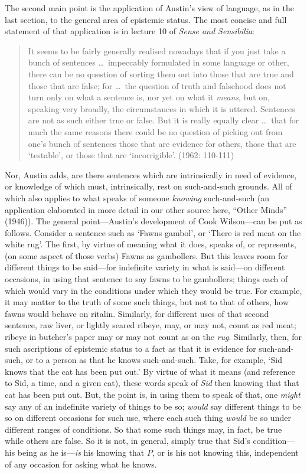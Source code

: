 The second main point is the application of Austin’s view of language, as in the last section, to the general area of epistemic status. The most concise and full statement of that application is in lecture 10 of \emph{Sense and Sensibilia}:
\begin{quote}
	It seems to be fairly generally realised nowadays that if you just take a bunch of sentences \ldots\ impeccably formulated in some language or other, there can be no question of sorting them out into those that are true and those that are false; for \ldots\ the question of truth and falsehood does not turn only on what a sentence is, nor yet on what it \emph{means}, but on, speaking very broadly, the circumstances in which it is uttered. Sentences are not as such either true or false. But it is really equally clear \ldots\ that for much the same reasons there could be no question of picking out from one’s bunch of sentences those that are evidence for others, those that are `testable', or those that are `incorrigible'. (1962: 110-111)
\end{quote}
Nor, Austin adds, are there sentences which are intrinsically in need of evidence, or knowledge of which must, intrinsically, rest on such-and-such grounds. All of which also applies to what speaks of someone \emph{knowing} such-and-such (an application elaborated in more detail in our other source here, “Other Minds” (1946)). The general point—Austin’s development of Cook Wilson---can be put as follows. Consider a sentence such as `Fawns gambol', or `There is red meat on the white rug'. The first, by virtue of meaning what it does, speaks of, or represents, (on some aspect of those verbs) Fawns as gambollers. But this leaves room for different things to be said—for indefinite variety in what is said—on different occasions, in using that sentence to say fawns to be gambollers; things each of which would vary in the conditions under which they would be true. For example, it may matter to the truth of some such things, but not to that of others, how fawns would behave on ritalin. Similarly, for different uses of that second sentence, raw liver, or lightly seared ribeye, may, or may not, count as red meat; ribeye in butcher’s paper may or may not count as on the \emph{rug}. Similarly, then, for such ascriptions of epistemic status to a fact as that it is evidence for such-and-such, or to a person as that he knows such-and-such. Take, for example, ‘Sid knows that the cat has been put out.’ By virtue of what it means (and reference to Sid, a time, and a given cat), these words speak of \emph{Sid} then knowing that that cat has been put out. But, the point is, in using them to speak of that, one \emph{might} say any of an indefinite variety of things to be so; \emph{would} say different things to be so on different occasions for such use, where each such thing \emph{would} be so under different ranges of conditions. So that some such things may, in fact, be true while others are false. So it is not, in general, simply true that Sid’s condition---his being as he is---\emph{is} his knowing that \( P \), or is his not knowing this, independent of any occasion for asking what he knows.

